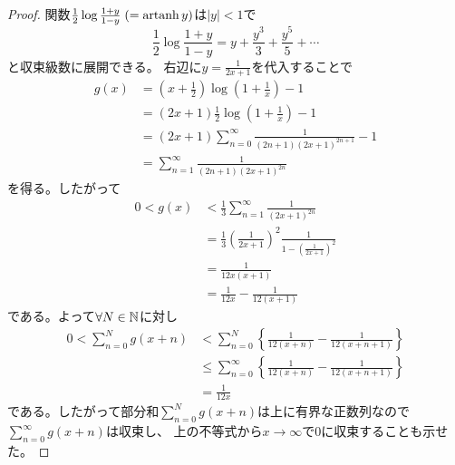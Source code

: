 \documentclass[report]{jlreq}
\begin{document}
\begin{proof}
    関数$\frac{1}{2} \log \frac{1+y}{1-y}\; (= \operatorname{artanh} y)$は$|y| < 1$で
    \begin{equation}
        \frac{1}{2} \log \frac{1+y}{1-y}
            = y + \frac{y^3}{3} + \frac{y^5}{5} + \cdots
    \end{equation}
    と収束級数に展開できる。
    右辺に$y = \frac{1}{2x + 1}$を代入することで
    \begin{equation}
        \begin{split}
            g(x)
                &= \left(x + \frac{1}{2}\right) \log \left(1 + \frac{1}{x}\right) - 1 \\
                &= (2x + 1) \frac{1}{2} \log \left(1 + \frac{1}{x}\right) - 1 \\
                &= (2x + 1) \sum_{n=0}^\infty \frac{1}{(2n + 1) (2x + 1)^{2n + 1}} - 1 \\
                &= \sum_{n=1}^\infty \frac{1}{(2n + 1) (2x + 1)^{2n}}
        \end{split}
    \end{equation}
    を得る。したがって
    \begin{equation}
        \begin{split}
            0 < g(x) &< \frac{1}{3} \sum_{n=1}^\infty \frac{1}{(2x + 1)^{2n}} \\
                &= \frac{1}{3} \left(\frac{1}{2x + 1}\right)^2
                    \frac{1}{1 - \left(\frac{1}{2x + 1}\right)^2} \\
                &= \frac{1}{12x(x+1)} \\
                &= \frac{1}{12x} - \frac{1}{12(x+1)}
        \end{split}
    \end{equation}
    である。よって$\forall N \in \mathbb{N}$に対し
    \begin{equation}
        \begin{split}
            0 < \sum_{n=0}^N g(x + n)
                &< \sum_{n=0}^N \left\{ \frac{1}{12(x + n)} - \frac{1}{12(x+n+1)} \right\} \\
                &\le \sum_{n=0}^\infty \left\{ \frac{1}{12(x + n)} - \frac{1}{12(x+n+1)} \right\} \\
                &= \frac{1}{12x}
        \end{split}
    \end{equation}
    である。したがって部分和$\sum_{n=0}^N g(x + n)$は上に有界な正数列なので
    $\sum_{n=0}^\infty g(x + n)$は収束し、
    上の不等式から$x \to \infty$で$0$に収束することも示せた。
\end{proof}
\end{document}
